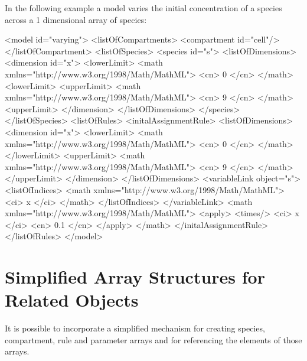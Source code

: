 \documentclass{cekarticle}
\begin{document}
In the following example a model varies the initial concentration of a species
across a 1 dimensional array of species:

\begin{example}
<model id="varying">
    <listOfCompartments>
        <compartment id="cell"/>
    </listOfCompartment>
    <listOfSpecies>
        <species id="s">
            <listOfDimensions>
                <dimension id="x">
                    <lowerLimit>
                        <math xmlns="http://www.w3.org/1998/Math/MathML">
                            <cn> 0 </cn>
                        </math>
                    <lowerLimit>
                    <upperLimit>
                        <math xmlns="http://www.w3.org/1998/Math/MathML">
                            <cn> 9 </cn>
                        </math>
                    <upperLimit>
                </dimension>
            </listOfDimensions>
        </species>
    </listOfSpecies>
    <listOfRules>
        <initalAssignmentRule>
            <listOfDimensions>
                <dimension id="x">
                    <lowerLimit>
                        <math xmlns="http://www.w3.org/1998/Math/MathML">
                            <cn> 0 </cn>
                        </math>
                    </lowerLimit>
                    <upperLimit>
                        <math xmlns="http://www.w3.org/1998/Math/MathML">
                            <cn> 9 </cn>
                        </math>
                    </upperLimit>
                </dimension>
            </listOfDimensions>
            <variableLink object="s">
                <listOfIndices>
                    <math xmlns="http://www.w3.org/1998/Math/MathML">
                        <ci> x </ci>
                    </math>          
                </listOfIndices>
            </variableLink>
            <math xmlns="http://www.w3.org/1998/Math/MathML">
                <apply>
                    <times/>
                    <ci> x </ci>
                    <cn> 0.1 </cn>
                </apply>
            </math>
        </initalAssignmentRule>
    </listOfRules>
</model>
\end{example}

\section{Simplified Array Structures for Related Objects}

It is possible to incorporate a simplified mechanism for creating
species, compartment, rule and parameter arrays and for referencing the
elements of those arrays.
\end{document}

